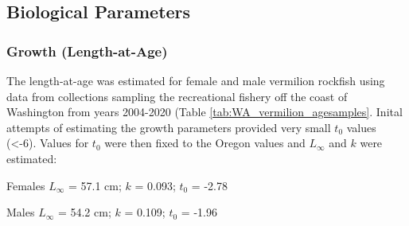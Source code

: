 \documentclass[11pt,
  english,
  a4paper,
]{article}
\begin{document}
\leavevmode\tagmcend\tagstructend\par


\hypertarget{biological-parameters}{%
\subsection{Biological Parameters}\label{biological-parameters}}

\leavevmode\tagmcend\tagstructend


\hypertarget{growth-length-at-age}{%
\subsubsection{Growth (Length-at-Age)}\label{growth-length-at-age}}

\leavevmode\tagmcend\tagstructend


The length-at-age was estimated for female and male vermilion rockfish using data from collections sampling the recreational fishery off the coast of Washington from years 2004-2020 (Table \ref{tab:WA_vermilion_agesamples}. Inital attempts of estimating the growth parameters provided very small {\(t_0\)\leavevmode\tagmcend\tagstructend} values (\textless-6). Values for {\(t_0\)\leavevmode\tagmcend\tagstructend} were then fixed to the Oregon values and {\(L_{\infty}\)\leavevmode\tagmcend\tagstructend} and {\(k\)\leavevmode\tagmcend\tagstructend} were estimated:

\leavevmode\tagmcend\tagstructend\par

\begin{centering}

Females $L_{\infty}$ = 57.1 cm; $k$ = 0.093; $t_0$ = -2.78

Males $L_{\infty}$ = 54.2 cm; $k$ = 0.109; $t_0$ = -1.96

\end{centering}

\vspace{0.5cm}

\end{document}
